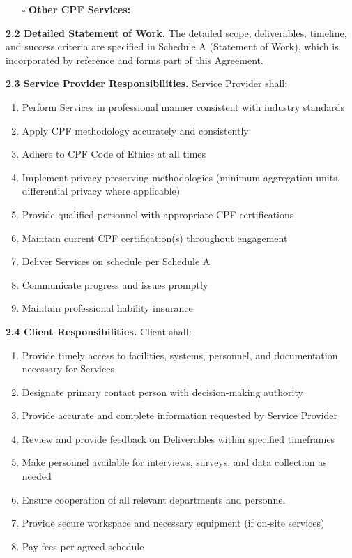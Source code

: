 \documentclass[11pt,a4paper]{article}
\begin{document}
\begin{itemize}
\item[$\square$] \textbf{Other CPF Services:}
\begin{itemize}
\item[] \underline{\hspace{10cm}}
\item[] \underline{\hspace{10cm}}
\end{itemize}
\end{itemize}

\textbf{2.2 Detailed Statement of Work.} The detailed scope, deliverables, timeline, and success criteria are specified in Schedule A (Statement of Work), which is incorporated by reference and forms part of this Agreement.

\textbf{2.3 Service Provider Responsibilities.} Service Provider shall:

\begin{enumerate}[label=\alph*)]
\item Perform Services in professional manner consistent with industry standards
\item Apply CPF methodology accurately and consistently
\item Adhere to CPF Code of Ethics at all times
\item Implement privacy-preserving methodologies (minimum aggregation units, differential privacy where applicable)
\item Provide qualified personnel with appropriate CPF certifications
\item Maintain current CPF certification(s) throughout engagement
\item Deliver Services on schedule per Schedule A
\item Communicate progress and issues promptly
\item Maintain professional liability insurance
\end{enumerate}

\textbf{2.4 Client Responsibilities.} Client shall:

\begin{enumerate}[label=\alph*)]
\item Provide timely access to facilities, systems, personnel, and documentation necessary for Services
\item Designate primary contact person with decision-making authority
\item Provide accurate and complete information requested by Service Provider
\item Review and provide feedback on Deliverables within specified timeframes
\item Make personnel available for interviews, surveys, and data collection as needed
\item Ensure cooperation of all relevant departments and personnel
\item Provide secure workspace and necessary equipment (if on-site services)
\item Pay fees per agreed schedule
\end{enumerate}
\end{document}
